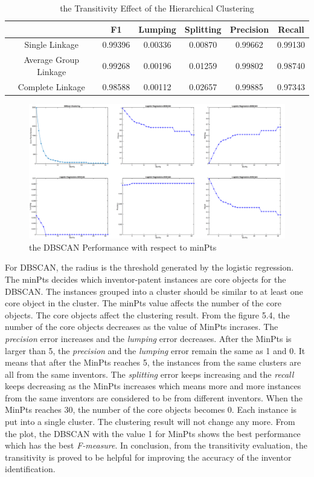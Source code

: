 \begin{table}
\centering
\begin{tabular}{|c|c|c|c|c|c|}
\hline
&F1&Lumping&Splitting&Precision&Recall\\
\hline
Single Linkage& 0.99396&0.00336 &0.00870 &0.99662 &0.99130 \\
\hline
Average Group Linkage&0.99268 &0.00196 & 0.01259& 0.99802& 0.98740\\
\hline
Complete Linkage&0.98588 & 0.00112 & 0.02657 &0.99885 &0.97343 \\
\hline
\end{tabular}
\caption{the Transitivity Effect of the Hierarchical Clustering}
\end{table}
\begin{figure}
\centering
\includegraphics[scale=0.2]{DBSCANT.pdf}
\caption{the DBSCAN Performance with respect to minPts}
\end{figure}

For DBSCAN, the radius is the threshold generated by the logistic regression. The minPts decides which inventor-patent instances are core objects for the DBSCAN. The instances grouped into a cluster should be similar to at least one core object in the cluster. The minPts value affects the number of the core objects. The core objects affect the clustering result. From the figure 5.4, the number of the core objects decreases as the value of MinPts incrases. The \emph{precision} error increases and the \emph{lumping} error decreases. After the MinPts is larger than 5, the \emph{precision} and the \emph{lumping} error remain the same as 1 and 0. It means that after the MinPts reaches 5, the instances from the same clusters are all from the same inventors. The \emph{splitting} error keeps increasing and the \emph{recall} keeps decreasing as the MinPts increases which means more and more instances from the same inventors are considered to be from different inventors. When the MinPts reaches 30, the number of the core objects becomes 0. Each instance is put into a single cluster. The clustering result will not change any more. From the plot, the DBSCAN with the value 1 for MinPts shows the best performance which has the best \emph{F-measure}. In conclusion, from the transitivity evaluation, the transitivity is proved to be helpful for improving the accuracy of the inventor identification.

